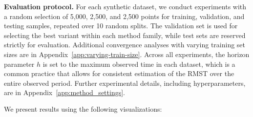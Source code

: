 \documentclass{article} %
\begin{document}
\textbf{Evaluation protocol.}
For each synthetic dataset, we conduct experiments with a random selection of 5,000, 2,500, and 2,500 points for training, validation, and testing samples, repeated over 10 random splits. The validation set is used for selecting the best variant within each method family, while test sets are reserved strictly for evaluation.  Additional convergence analyses with varying training set sizes are in Appendix~\ref{app:varying-train-size}. Across all experiments, the horizon parameter $h$ is set to the maximum observed time in each dataset, which is a common practice that allows for consistent estimation of the RMST over the entire observed period. Further experimental details, including hyperparameters, are in Appendix~\ref{app:method_settings}.

We present results using the following visualizations: 
\end{document}

